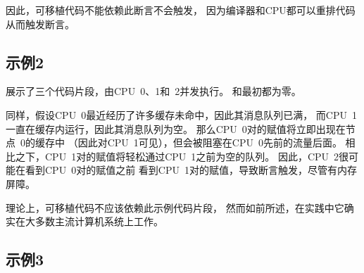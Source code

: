 因此，可移植代码不能依赖此断言不会触发，
因为编译器和CPU都可以重排代码从而触发断言。

\QuickQuizEnd

\subsection{示例2}
\label{sec:app:whymb:Example 2}

展示了三个代码片段，由CPU~0、1和~2并发执行。
和最初都为零。

\begin{listing}
\scriptsize
{}
\caption{内存屏障示例2}
\label{lst:app:whymb:Memory Barrier Example 2}
\end{listing}

同样，假设CPU~0最近经历了许多缓存未命中，因此其消息队列已满，
而CPU~1一直在缓存内运行，因此其消息队列为空。
那么CPU~0对的赋值将立即出现在节点~0的缓存中
（因此对CPU~1可见），但会被阻塞在CPU~0先前的流量后面。
相比之下，CPU~1对的赋值将轻松通过CPU~1之前为空的队列。
因此，CPU~2很可能在看到CPU~0对的赋值之前
看到CPU~1对的赋值，导致断言触发，尽管有内存屏障。

理论上，可移植代码不应该依赖此示例代码片段，
然而如前所述，在实践中它确实在大多数主流计算机系统上工作。

\subsection{示例3}
\label{sec:app:whymb:Example 3}

